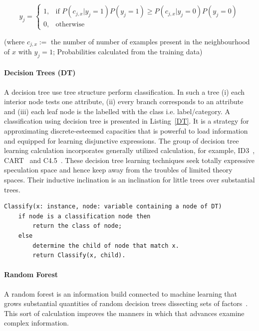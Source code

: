 \begin{equation}
 y_{j} = 
\begin{cases}
    1, & \text{if } P(c_{j,x}|y_j = 1)P(y_j = 1) \geq P(c_{j,x}|y_j = 0)P(y_j = 0) \\
    0, & \text{otherwise}
\end{cases}
\end{equation}

(where $c_{j,x} :=$ the number of number of examples present in the neighbourhood of $x$ with $y_j = 1$; Probabilities calculated from the training data)

\paragraph{Decision Trees (DT)}
A decision tree use tree structure perform classification. In such a tree (i) each interior node tests one attribute, (ii) every branch corresponds to an attribute and (iii) each leaf node is the labelled with the class i.e. label/category. A classification using decision tree is presented in Listing~\ref{DT}. It is a strategy for approximating discrete-esteemed capacities that is powerful to load information and equipped for learning disjunctive expressions. The group of decision tree learning calculation incorporates generally utilized calculation, for example, ID3~\cite{quinlan1986induction}, CART~\cite{breiman2017classification} and C4.5~\cite{xiaoliang2009research}. These decision tree learning techniques seek totally expressive speculation space and hence keep away from the troubles of limited theory spaces. Their inductive inclination is an inclination for little trees over substantial trees. 
\begin{lstlisting}[caption = Classification with Decision Trees, label = DT]
Classify(x: instance, node: variable containing a node of DT)
    if node is a classification node then
        return the class of node;
    else
        determine the child of node that match x.
        return Classify(x, child).

\end{lstlisting}



\paragraph{Random Forest}
A random forest is an information build connected to machine learning that grows substantial quantities of random decision trees dissecting sets of factors~\cite{breiman2001random}. This sort of calculation improves the manners in which that advances examine complex information. 

